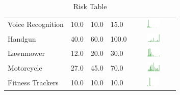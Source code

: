 \begin{table}[H!]
\begin{center}
\begin{tabular}{| p{2cm} | p{1cm} | p{1cm} | p{1cm} | c |}
Voice Recognition  & 10.0 & 10.0 & 15.0 & \includegraphics[width = 2cm, height = 0.5cm]{tables/voicerecognitionrisk} \\ 
Handgun & 40.0 & 60.0 & 100.0 & \includegraphics[width = 2cm, height = 0.5cm]{tables/HandgunRisk} \\ 
Lawnmower & 12.0 & 20.0 & 30.0 & \includegraphics[width = 2cm, height = 0.5cm]{tables/LawnmowerRisk} \\ 
Motorcycle & 27.0 & 45.0 & 70.0 & \includegraphics[width = 2cm, height = 0.5cm]{tables/MotorcycleRisk} \\ 
Fitness Trackers  & 10.0 & 10.0 & 10.0 & \includegraphics[width = 2cm, height = 0.5cm]{tables/fitnesstrackersrisk} \\ 
\hline
\end{tabular}
\caption{Risk Table}
\label{top10}
\end{center}
\end{table}
